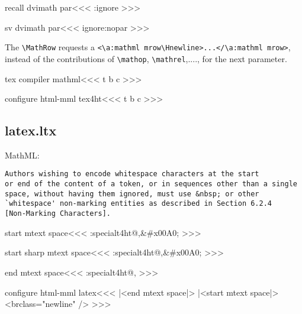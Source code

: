 {{{{{{\<recall dvimath par\><<<
\sv:ignore
>>>

\<sv dvimath par\><<<
\edef\sv:ignore{\if:nopar  
    \noexpand\IgnorePar\else \noexpand\ShowPar\fi}%
>>>


The \verb'\MathRow' requests a \verb'<\a:mathml mrow\Hnewline>...</\a:mathml mrow>', instead of the contributions
of \verb'\mathop', \verb'\mathrel',...., for the next parameter.


\<tex compiler mathml\><<<
\def\:MT{\ifmathml \a:mathml m\fi}
\Configure{halignTB}{\HCode{<\:MT table }\halignTBL}{\HCode{>}}
   {t}{}
   {b}{}
   {c}{}
   {}
\def\t:HA{\HCode{</\:MT table>}}
\def\R:HA{\HCode{<\:MT tr \Hnewline style="vertical-align:baseline">}}
\def\r:HA{\HCode{</\:MT tr>}}
\def\D:HA{|<td save EndP|>\HCode{<\:MT td 
                        \ifnum \HMultispan>1 colspan="\HMultispan"\fi}%
   \halignTD \HCode{\Hnewline>}}
\def\d:HA{\HCode{</\:MT td>}|<td recall EndP|>}
>>>

\<configure html-mml tex4ht\><<< 
   {t}{\ifmathml {}\fi}
   {b}{\ifmathml {}\fi}
   {c}{\ifmathml {}\fi}
   {}
>>>


\subsection{latex.ltx}


MathML: 
\begin{verbatim}
Authors wishing to encode whitespace characters at the start
or end of the content of a token, or in sequences other than a single
space, without having them ignored, must use &nbsp; or other
`whitespace' non-marking entities as described in Section 6.2.4
[Non-Marking Characters].
\end{verbatim}

\<start mtext space\><<<
\ht:special{t4ht@,&\#x00A0;}%
>>>

\<start sharp mtext space\><<<
\ht:special{t4ht@,&#x00A0;}%
>>>

\<end mtext space\><<<
\ht:special{t4ht@,}%
>>>


\<configure html-mml latex\><<<
  {\ifmtext |<end mtext space|>%
            |<start mtext space|>%
   \else \Tg<br\Hnewline class="newline" />\fi}
>>>

}}}}}}

